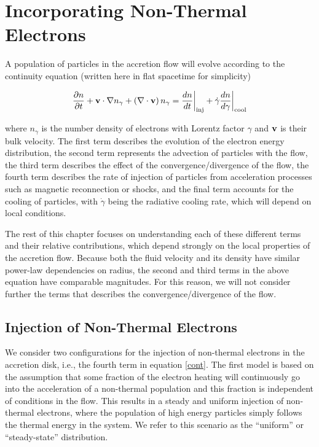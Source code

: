 \section{Incorporating Non-Thermal Electrons}
A population of particles in the accretion flow will evolve according to the continuity equation (written here in flat spacetime for simplicity)

\begin{equation}
	\frac{\partial n}{\partial t} + \bold{v} \cdot \nabla n_{\gamma} + \left(\nabla \cdot \bold{v} \right) n_{\gamma} = \frac{d n}{dt}\bigg{|}_{\rm{inj}} + \dot{\gamma}\frac{dn}{d\gamma}\bigg{|}_{\rm{cool}}
	\label{cont}
\end{equation}

where $n_{\gamma}$ is the number density of electrons with Lorentz factor $\gamma$ and $\bold{v}$ is their bulk velocity.  The first term describes the evolution of the electron energy distribution, the second term represents the advection of particles with the flow, the third term describes the effect of the convergence/divergence of the flow, the fourth term describes the rate of injection of particles from acceleration processes such as magnetic reconnection or shocks, and the final term accounts for the cooling of particles, with $\dot{\gamma}$ being the radiative cooling rate, which will depend on local conditions.

The rest of this chapter focuses on understanding each of these different terms and their relative contributions, which depend strongly on the local properties of the accretion flow.  Because both the fluid velocity and its density have similar power-law dependencies on radius, the second and third terms in the above equation have comparable magnitudes.  For this reason, we will not consider further the terms that describes the convergence/divergence of the flow.
\subsection{Injection of Non-Thermal Electrons}
We consider two configurations for the injection of non-thermal electrons in the accretion disk, i.e., the fourth term in equation \ref{cont}.  The first model is based on the
assumption that some fraction of the electron heating will
continuously go into the acceleration of a non-thermal
population and this fraction is independent of conditions
in the flow. This results in a steady and uniform injection
of non-thermal electrons, where the population of high
energy particles simply follows the thermal energy in the
system. We refer to this scenario as the ``uniform'' or ``steady-state'' distribution.

